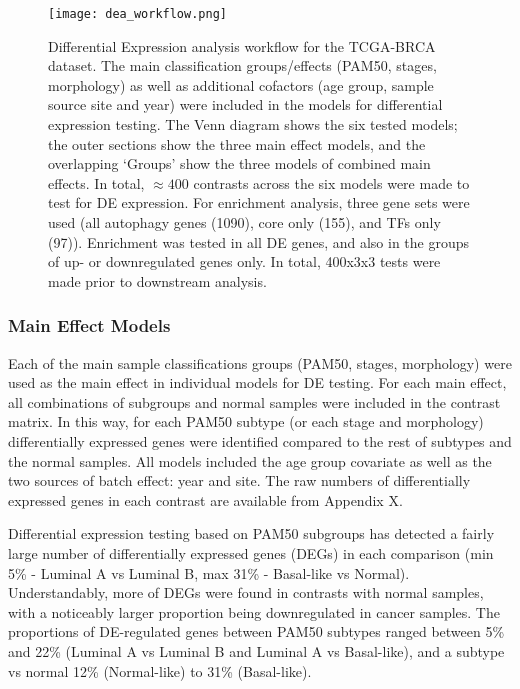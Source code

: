        
            \begin{figure}[!h]
            \centering
            \texttt{[image: dea\_workflow.png]} 
            \caption{Differential Expression analysis workflow for the TCGA-BRCA dataset. The main classification groups/effects (PAM50, stages, morphology) as well as additional cofactors (age group, sample source site and year) were included in the models for differential expression testing. The Venn diagram shows the six tested models; the outer sections show the three main effect models, and the overlapping ‘Groups' show the three models of combined main effects. In total, $\approx 400$ contrasts across the six models were made to test for DE expression. For enrichment analysis, three gene sets were used (all autophagy genes (1090), core only (155), and TFs only (97)). Enrichment was tested in all DE genes, and also in the groups of up- or downregulated genes only. In total, 400x3x3 tests were made prior to downstream analysis.  }
            \label{fig:deaworkflow}
            \end{figure}

        \subsubsection{Main Effect Models}
        
        Each of the main sample classifications groups (PAM50, stages, morphology) were used as the main effect in individual models for DE testing. For each main effect, all combinations of subgroups and normal samples were included in the contrast matrix. In this way, for each PAM50 subtype (or each stage and morphology) differentially expressed genes were identified compared to the rest of subtypes and the normal samples. All models included the age group covariate as well as the two sources of batch effect: year and site. The raw numbers of differentially expressed genes in each contrast are available from Appendix X.

        Differential expression testing based on PAM50 subgroups has detected a fairly large number of differentially expressed genes (DEGs) in each comparison (min 5\% - Luminal A vs Luminal B, max 31\% - Basal-like vs Normal). Understandably, more of DEGs were found in contrasts with normal samples, with a noticeably larger proportion being downregulated in cancer samples. The proportions of DE-regulated genes between PAM50 subtypes ranged between 5\% and 22\% (Luminal A vs Luminal B and Luminal A vs Basal-like), and a subtype vs normal 12\% (Normal-like) to 31\% (Basal-like). 
        
